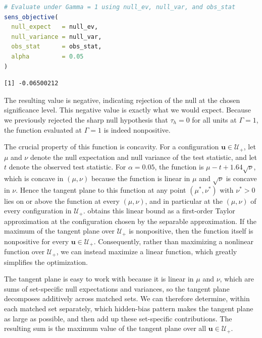\documentclass[twoside,11pt]{article}
\begin{document}
\begin{lstlisting}[language=R]
# Evaluate under Gamma = 1 using null_ev, null_var, and obs_stat
sens_objective(
  null_expect   = null_ev,
  null_variance = null_var,
  obs_stat      = obs_stat,
  alpha         = 0.05
)
\end{lstlisting}

\begin{verbatim}
[1] -0.06500212
\end{verbatim}



The resulting value is negative, indicating rejection of the null at the
chosen significance level. This negative value is exactly what we would expect. Because
we previously rejected the sharp null hypothesis that \(\tau_h = 0\) for
all units at \(\Gamma = 1\), the function evaluated at \(\Gamma = 1\) is
indeed nonpositive.

The crucial property of this function is concavity. For a configuration
\(\bm{u} \in \mathcal{U}_{+}\), let \(\mu\) and \(\nu\) denote the null
expectation and null variance of the test statistic, and let \(t\) denote
the observed test statistic. For \(\alpha = 0.05\), the function is
\(\mu - t + 1.64\sqrt{\nu}\), which is concave in \((\mu, \nu)\) because the
function is linear in \(\mu\) and \(\sqrt{\nu}\) is concave in \(\nu\). Hence
the tangent plane to this function at any point \((\mu^{*}, \nu^{*})\) with
\(\nu^{*} > 0\) lies on or above the function at every \((\mu, \nu)\), and
in particular at the \((\mu, \nu)\) of every configuration in
\(\mathcal{U}_{+}\). \citet[pp.~2322--2323]{rosenbaum2018} obtains this
linear bound as a first-order Taylor approximation at the configuration
chosen by the separable approximation. If the maximum of the tangent
plane over \(\mathcal{U}_{+}\) is nonpositive, then the function itself is
nonpositive for every \(\bm{u} \in \mathcal{U}_{+}\). Consequently, rather
than maximizing a nonlinear function over \(\mathcal{U}_{+}\), we can
instead maximize a linear function, which greatly simplifies the
optimization.

The tangent plane is easy to work with because it is linear in \(\mu\) and
\(\nu\), which are sums of set-specific null expectations and variances, so
the tangent plane decomposes additively across matched sets. We can
therefore determine, within each matched set separately, which
hidden-bias pattern makes the tangent plane as large as possible, and
then add up these set-specific contributions. The resulting sum is the
maximum value of the tangent plane over all \(\bm{u} \in \mathcal{U}_{+}\).
\end{document}
